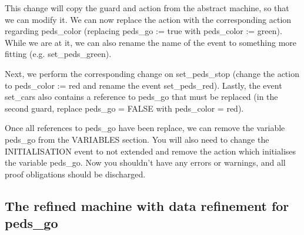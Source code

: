 This change will copy the guard and action from the abstract machine, so that we can modify it.  We can now replace the action with the corresponding action regarding \textsf{peds\_color} (replacing \textsf{peds\_go := true} with \textsf{peds\_color := green}).  While we are at it, we can also rename the name of the event to something more fitting (e.g. \textsf{set\_peds\_green}).

Next, we perform the corresponding change on \textsf{set\_peds\_stop} (change the action to \textsf{peds\_color := red} and rename the event \textsf{set\_peds\_red}). Lastly, the event \textsf{set\_cars} also contains a reference to \textsf{peds\_go} that must be replaced (in the second guard, replace \textsf{peds\_go = FALSE} with \textsf{peds\_color = red}).

Once all references to \textsf{peds\_go} have been replace, we can remove the variable \textsf{peds\_go} from the \textsf{VARIABLES} section. You will also need to change the \textsf{INITIALISATION} event to not extended and remove the action which initialises the variable \textsf{peds\_go}. Now you shouldn't have any errors or warnings, and all proof obligations should be discharged.


\subsection{The refined machine with data refinement for peds\_go}
\label{tut_refined_machine}

